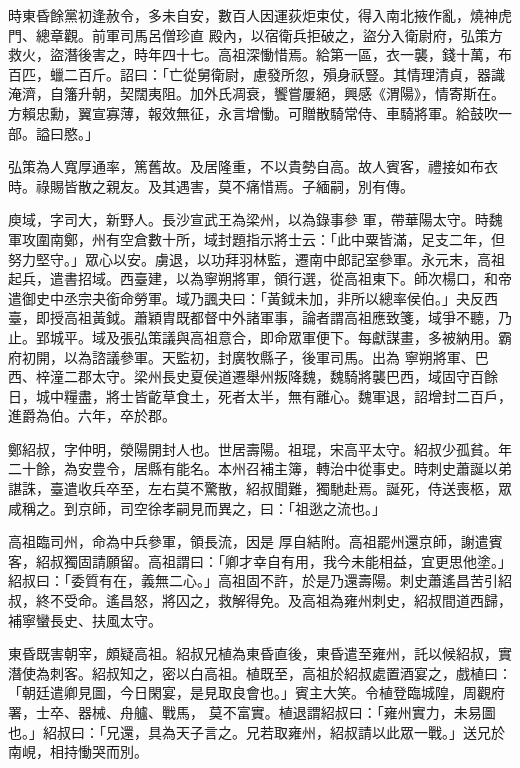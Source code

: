 \begin{pinyinscope}
 時東昏餘黨初逢赦令，多未自安，數百人因運荻炬束仗，得入南北掖作亂，燒神虎門、總章觀。前軍司馬呂僧珍直
 殿內，以宿衛兵拒破之，盜分入衛尉府，弘策方救火，盜潛後害之，時年四十七。高祖深慟惜焉。給第一區，衣一襲，錢十萬，布百匹，蠟二百斤。詔曰：「亡從舅衛尉，慮發所忽，殞身祅豎。其情理清貞，器識淹濟，自籓升朝，契闊夷阻。加外氏凋衰，饗嘗屢絕，興感《渭陽》，情寄斯在。方賴忠勳，翼宣寡薄，報效無征，永言增慟。可贈散騎常侍、車騎將軍。給鼓吹一部。謚曰愍。」



 弘策為人寬厚通率，篤舊故。及居隆重，不以貴勢自高。故人賓客，禮接如布衣時。祿賜皆散之親友。及其遇害，莫不痛惜焉。子緬嗣，別有傳。



 庾域，字司大，新野人。長沙宣武王為梁州，以為錄事參
 軍，帶華陽太守。時魏軍攻圍南鄭，州有空倉數十所，域封題指示將士云：「此中粟皆滿，足支二年，但努力堅守。」眾心以安。虜退，以功拜羽林監，遷南中郎記室參軍。永元末，高祖起兵，遣書招域。西臺建，以為寧朔將軍，領行選，從高祖東下。師次楊口，和帝遣御史中丞宗夬銜命勞軍。域乃諷夬曰：「黃鉞未加，非所以總率侯伯。」夬反西臺，即授高祖黃鉞。蕭穎胄既都督中外諸軍事，論者謂高祖應致箋，域爭不聽，乃止。郢城平。域及張弘策議與高祖意合，即命眾軍便下。每獻謀畫，多被納用。霸府初開，以為諮議參軍。天監初，封廣牧縣子，後軍司馬。出為
 寧朔將軍、巴西、梓潼二郡太守。梁州長史夏侯道遷舉州叛降魏，魏騎將襲巴西，域固守百餘日，城中糧盡，將士皆齕草食土，死者太半，無有離心。魏軍退，詔增封二百戶，進爵為伯。六年，卒於郡。



 鄭紹叔，字仲明，滎陽開封人也。世居壽陽。祖琨，宋高平太守。紹叔少孤貧。年二十餘，為安豊令，居縣有能名。本州召補主簿，轉治中從事史。時刺史蕭誕以弟諶誅，臺遣收兵卒至，左右莫不驚散，紹叔聞難，獨馳赴焉。誕死，侍送喪柩，眾咸稱之。到京師，司空徐孝嗣見而異之，曰：「祖逖之流也。」



 高祖臨司州，命為中兵參軍，領長流，因是
 厚自結附。高祖罷州還京師，謝遣賓客，紹叔獨固請願留。高祖謂曰：「卿才幸自有用，我今未能相益，宜更思他塗。」紹叔曰：「委質有在，義無二心。」高祖固不許，於是乃還壽陽。刺史蕭遙昌苦引紹叔，終不受命。遙昌怒，將囚之，救解得免。及高祖為雍州刺史，紹叔間道西歸，補寧蠻長史、扶風太守。



 東昏既害朝宰，頗疑高祖。紹叔兄植為東昏直後，東昏遣至雍州，託以候紹叔，實潛使為刺客。紹叔知之，密以白高祖。植既至，高祖於紹叔處置酒宴之，戲植曰：「朝廷遣卿見圖，今日閑宴，是見取良會也。」賓主大笑。令植登臨城隍，周觀府署，士卒、器械、舟艫、戰馬，
 莫不富實。植退謂紹叔曰：「雍州實力，未易圖也。」紹叔曰：「兄還，具為天子言之。兄若取雍州，紹叔請以此眾一戰。」送兄於南峴，相持慟哭而別。




\end{pinyinscope}
